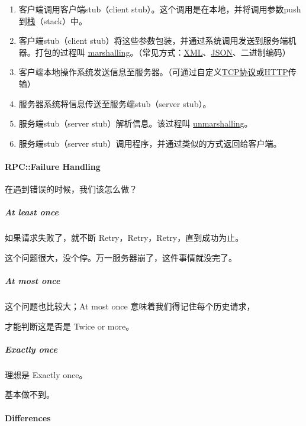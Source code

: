 \documentclass[
]{article}
\begin{document}
\begin{enumerate}
\def\labelenumi{\arabic{enumi}.}
\item
  客户端调用客户端stub（client
  stub）。这个调用是在本地，并将调用参数push到\href{https://zh.wikipedia.org/wiki/栈}{栈}（stack）中。
\item
  客户端stub（client
  stub）将这些参数包装，并通过系统调用发送到服务端机器。打包的过程叫
  \href{https://zh.wikipedia.org/wiki/Marshalling_(计算机科学)}{marshalling}。（常见方式：\href{https://zh.wikipedia.org/wiki/XML}{XML}、\href{https://zh.wikipedia.org/wiki/JSON}{JSON}、二进制编码）
\item
  客户端本地操作系统发送信息至服务器。（可通过自定义\href{https://zh.wikipedia.org/wiki/传输控制协议}{TCP协议}或\href{https://zh.wikipedia.org/wiki/HTTP}{HTTP}传输）
\item
  服务器系统将信息传送至服务端stub（server stub）。
\item
  服务端stub（server stub）解析信息。该过程叫
  \href{https://zh.wikipedia.org/wiki/Unmarshalling_(计算机科学)}{unmarshalling}。
\item
  服务端stub（server stub）调用程序，并通过类似的方式返回给客户端。
\end{enumerate}

\hypertarget{header-n158}{%
\paragraph{RPC::Failure Handling}\label{header-n158}}

在遇到错误的时候，我们该怎么做？

\hypertarget{header-n160}{%
\subparagraph{At least once}\label{header-n160}}

如果请求失败了，就不断 Retry，Retry，Retry，直到成功为止。

这个问题很大，没个停。万一服务器崩了，这件事情就没完了。

\hypertarget{header-n163}{%
\subparagraph{At most once}\label{header-n163}}

这个问题也比较大；At most once 意味着我们得记住每个历史请求，

才能判断这是否是 Twice or more。

\hypertarget{header-n166}{%
\subparagraph{Exactly once}\label{header-n166}}

理想是 Exactly once。

基本做不到。

\hypertarget{header-n169}{%
\paragraph{Differences}\label{header-n169}}
\end{document}
